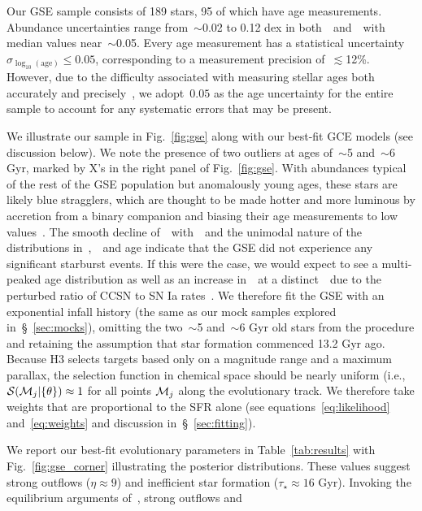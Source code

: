 \documentclass[ms.tex]{subfiles}
\begin{document}
Our GSE sample consists of 189 stars, 95 of which have age measurements.
Abundance uncertainties range from~$\sim$0.02 to 0.12 dex in
both~\feh~and~\afe~with median values near~$\sim$0.05.
Every age measurement has a statistical uncertainty
$\sigma_{\log_{10}(\text{age})} \leq 0.05$, corresponding to a measurement
precision of~$\lesssim$12\%.
However, due to the difficulty associated with measuring stellar ages both
accurately and precisely~\citep[e.g.,][]{Soderblom2010, Chaplin2013, Angus2019},
we adopt~$0.05$ as the age uncertainty for the entire sample to account for any
systematic errors that may be present.
\par
We illustrate our sample in Fig.~\ref{fig:gse} along with our best-fit GCE
models (see discussion below).
We note the presence of two outliers at ages of~$\sim$5 and~$\sim$6 Gyr, marked
by X's in the right panel of Fig.~\ref{fig:gse}.
With abundances typical of the rest of the GSE population but anomalously young
ages, these stars are likely blue stragglers, which are thought to be made
hotter and more luminous by accretion from a binary companion and biasing their
age measurements to low values~\citep[e.g.][]{Bond1971, Stryker1993}.
The smooth decline of~\afe~with~\feh~and the unimodal nature of the
distributions in~\feh,~\afe~and age indicate that the GSE did not experience
any significant starburst events.
If this were the case, we would expect to see a multi-peaked age distribution
as well as an increase in~\afe~at a distinct~\feh~due to the perturbed ratio of
CCSN to SN Ia rates~\citep{Johnson2020}.
We therefore fit the GSE with an exponential infall history (the same as our
mock samples explored in~\S~\ref{sec:mocks}), omitting the two~$\sim$5
and~$\sim$6 Gyr old stars from the procedure and retaining the assumption that
star formation commenced 13.2 Gyr ago.
Because H3 selects targets based only on a magnitude range and a maximum
parallax, the selection function in chemical space should be nearly uniform
(i.e.,~$\mathcal{S}(\mathcal{M}_j | \{\theta\}) \approx 1$ for all points
$\mathcal{M}_j$ along the evolutionary track.
We therefore take weights that are proportional to the SFR alone (see
equations~\ref{eq:likelihood} and~\ref{eq:weights} and discussion
in~\S~\ref{sec:fitting}).
\par
We report our best-fit evolutionary parameters in Table~\ref{tab:results}
with Fig.~\ref{fig:gse_corner} illustrating the posterior distributions.
These values suggest strong outflows ($\eta \approx 9$) and inefficient star
formation ($\tau_\star \approx 16$ Gyr).
Invoking the equilibrium arguments of~\citet{Weinberg2017}, strong outflows and
\end{document}
